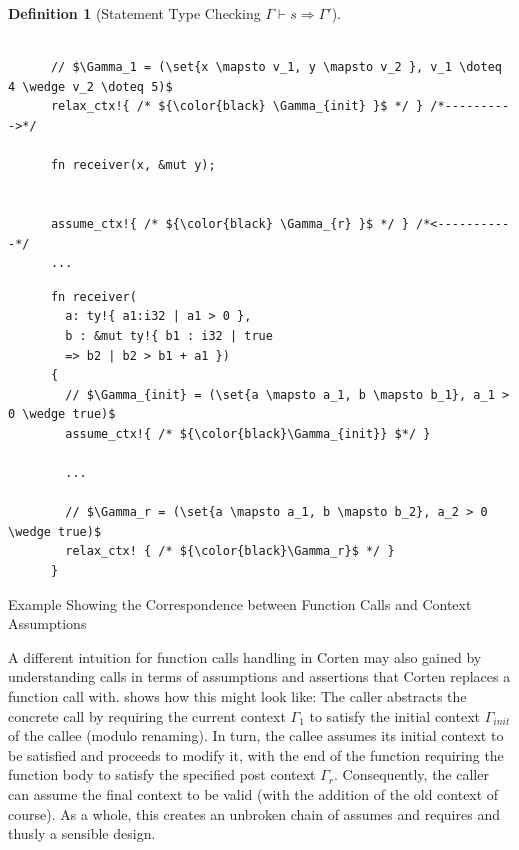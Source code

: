 \documentclass[twoside, english]{sdqthesis}
\newcommand{\set}[1]{\left\{ #1 \right\}}
\theoremstyle{definition}
\newtheorem{definition}[theorem]{Definition}
\begin{document}
\begin{definition}[Statement Type Checking $\Gamma \vdash s \Rightarrow \Gamma'$]
\begin{listing}[h]
\begin{minipage}[t]{0.48\linewidth}
\begin{verbatim}
      
      // $\Gamma_1 = (\set{x \mapsto v_1, y \mapsto v_2 }, v_1 \doteq 4 \wedge v_2 \doteq 5)$
      relax_ctx!{ /* ${\color{black} \Gamma_{init} }$ */ } /*---------->*/

      fn receiver(x, &mut y);

      
      assume_ctx!{ /* ${\color{black} \Gamma_{r} }$ */ } /*<-----------*/
      ...
    \end{verbatim}
  \end{minipage}
  \begin{minipage}[t]{0.48\linewidth}
    \begin{verbatim}
      fn receiver(
        a: ty!{ a1:i32 | a1 > 0 },
        b : &mut ty!{ b1 : i32 | true
        => b2 | b2 > b1 + a1 }) 
      {
        // $\Gamma_{init} = (\set{a \mapsto a_1, b \mapsto b_1}, a_1 > 0 \wedge true)$
        assume_ctx!{ /* ${\color{black}\Gamma_{init}} $*/ }

        ...

        // $\Gamma_r = (\set{a \mapsto a_1, b \mapsto b_2}, a_2 > 0 \wedge true)$
        relax_ctx! { /* ${\color{black}\Gamma_r}$ */ }
      }
    \end{verbatim}
  \end{minipage}
  \caption{Example Showing the Correspondence between Function Calls and Context Assumptions}
  \label{lst:example-correspondence-subcontext}
\end{listing}

A different intuition for function calls handling in Corten may also gained by understanding calls in terms of assumptions  and assertions  that Corten replaces a function call with.  shows how this might look like: The caller abstracts the concrete call by requiring the current context $\Gamma_1$ to satisfy the initial context $\Gamma_{init}$ of the callee (modulo renaming). In turn, the callee assumes its initial context to be satisfied and proceeds to modify it, with the end of the function requiring the function body to satisfy the specified post context $\Gamma_r$. Consequently, the caller can assume the final context to be valid (with the addition of the old context of course). As a whole, this creates an unbroken chain of assumes and requires and thusly a sensible design.

\end{definition}

\end{document}
